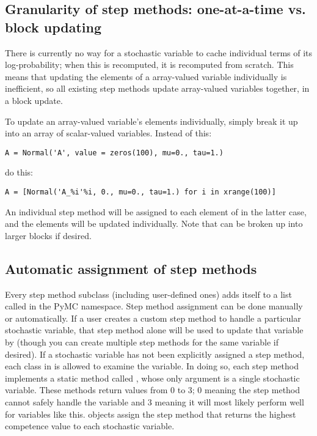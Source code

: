 \subsection*{Granularity of step methods: one-at-a-time vs. block updating} 
There is currently no way for a stochastic variable to cache individual terms of its log-probability; when this is recomputed, it is recomputed from scratch. This means that updating the elements of a array-valued variable individually is inefficient, so all existing step methods update array-valued variables together, in a block update.

To update an array-valued variable's elements individually, simply break it up into an array of scalar-valued variables. Instead of this:
\begin{verbatim}
A = Normal('A', value = zeros(100), mu=0., tau=1.)    
\end{verbatim}
do this:
\begin{verbatim}
A = [Normal('A_%i'%i, 0., mu=0., tau=1.) for i in xrange(100)]
\end{verbatim}
An individual step method will be assigned to each element of  in the latter case, and the elements will be updated individually. Note that  can be broken up into larger blocks if desired.

\subsection*{Automatic assignment of step methods} 
Every step method subclass (including user-defined ones) adds itself to a list called  in the PyMC namespace. Step method assignment can be done manually or automatically. If a user creates a custom step method to handle a particular stochastic variable, that step method alone will be used to update that variable by  (though you can create multiple step methods for the same variable if desired). If a stochastic variable has not been explicitly assigned a step method, each class in  is allowed to examine the variable. In doing so, each step method implements a static method called , whose only argument is a single stochastic variable. These methods return values from 0 to 3; 0 meaning the step method cannot safely handle the variable and 3 meaning it will most likely perform well for variables like this.  objects assign the step method that returns the highest competence value to each stochastic variable.

